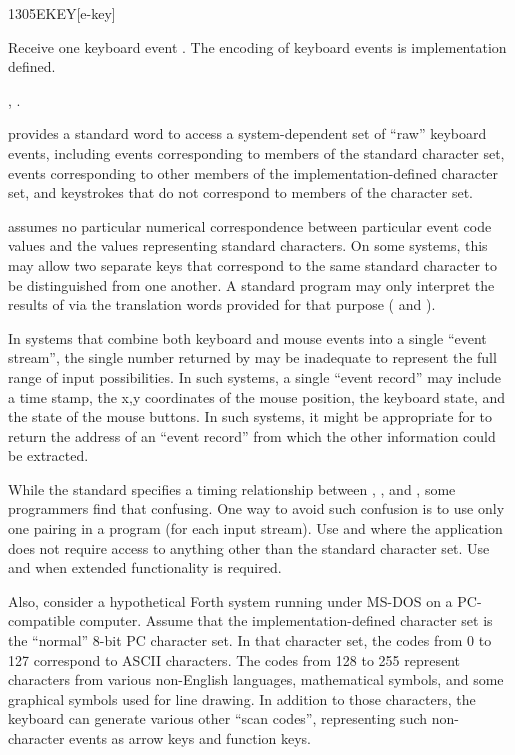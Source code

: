 \begin{worddef}{1305}{EKEY}[e-key]
\item {}

	Receive one keyboard event . The encoding of keyboard events
	is implementation defined.

\see {},
	.

	\begin{defer}
	\rationale %
		 provides a standard word to access a
		system-dependent set of ``raw'' keyboard events, including
		events corresponding to members of the standard character
		set, events corresponding to other members of the
		implementation-defined character set, and keystrokes that
		do not correspond to members of the character set.

		 assumes no particular numerical correspondence
		between particular event code values and the values
		representing standard characters. On some systems, this may
		allow two separate keys that correspond to the same standard
		character to be distinguished from one another.
		A standard program may only interpret the results of
		 via the translation words provided for that
		purpose ( and ).

		In systems that combine both keyboard and mouse events into
		a single ``event stream'', the single number returned by
		 may be inadequate to represent the full range of
		input possibilities. In such systems, a single ``event
		record'' may include a time stamp, the x,y coordinates of
		the mouse position, the keyboard state, and the state of
		the mouse buttons. In such systems, it might be appropriate
		for  to return the address of an ``event record''
		from which the other information could be extracted.

		While the standard specifies a timing relationship between
		, ,  and , some
		programmers find that confusing.
		One way to avoid such confusion is to use only one pairing
		in a program (for each input stream).  Use  and
		 where the application does not require access to
		anything other than the standard character set.  Use
		 and  when extended functionality is
		required.

		Also, consider a hypothetical Forth system running under
		MS-DOS on a PC-compatible computer. Assume that the
		implementation-defined character set is the ``normal'' 8-bit
		PC character set. In that character set, the codes from 0 to
		127 correspond to ASCII characters. The codes from 128 to 255
		represent characters from various non-English languages,
		mathematical symbols, and some graphical symbols used for line
		drawing. In addition to those characters, the keyboard can
		generate various other ``scan codes'', representing such
		non-character events as arrow keys and function keys.


\end{defer}
\end{worddef}
